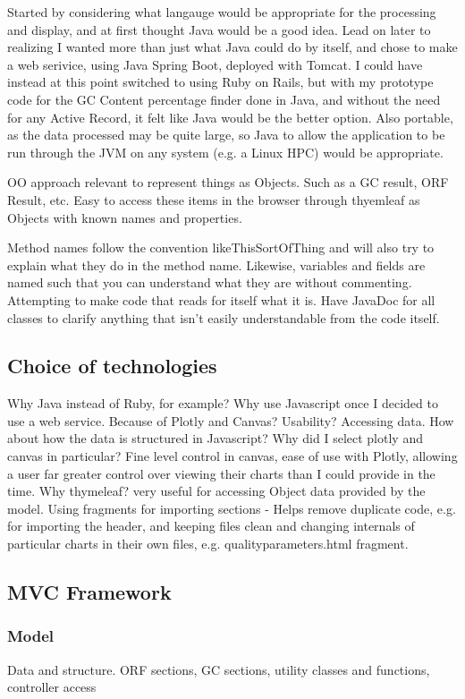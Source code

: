 Started by considering what langauge would be appropriate for the processing and display, and at first thought Java would be a good idea. Lead on later to realizing I wanted more than just what Java could do by itself, and chose to make a web serivice, using Java Spring Boot, deployed with Tomcat. I could have instead at this point switched to using Ruby on Rails, but with my prototype code for the GC Content percentage finder done in Java, and without the need for any Active Record, it felt like Java would be the better option. Also portable, as the data processed may be quite large, so Java to allow the application to be run through the JVM on any system (e.g. a Linux HPC) would be appropriate.

OO approach relevant to represent things as Objects. Such as a GC result, ORF Result, etc. Easy to access these items in the browser through thyemleaf as Objects with known names and properties.

Method names follow the convention likeThisSortOfThing and will also try to explain what they do in the method name. Likewise, variables and fields are named such that you can understand what they are without commenting. Attempting to make code that reads for itself what it is. Have JavaDoc for all classes to clarify anything that isn't easily understandable from the code itself.

\subsection{Choice of technologies}
Why Java instead of Ruby, for example?
Why use Javascript once I decided to use a web service. Because of Plotly and Canvas? Usability? Accessing data. How about how the data is structured in Javascript?
Why did I select plotly and canvas in particular? Fine level control in canvas, ease of use with Plotly, allowing a user far greater control over viewing their charts than I could provide in the time.
Why thymeleaf? very useful for accessing Object data provided by the model. Using fragments for importing sections - Helps remove duplicate code, e.g. for importing the header, and keeping files clean and changing internals of particular charts in their own files, e.g. qualityparameters.html fragment.

\subsection{MVC Framework}
\subsubsection{Model}
Data and structure. ORF sections, GC sections, utility classes and functions, controller access
